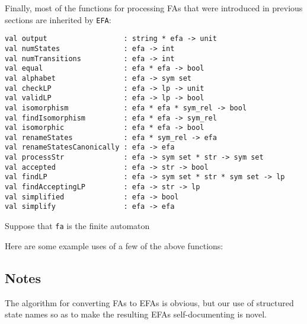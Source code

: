 Finally, most of the functions for processing FAs that were introduced
in previous sections are inherited by \texttt{EFA}:
\begin{verbatim}
val output                  : string * efa -> unit 
val numStates               : efa -> int
val numTransitions          : efa -> int
val equal                   : efa * efa -> bool
val alphabet                : efa -> sym set
val checkLP                 : efa -> lp -> unit
val validLP                 : efa -> lp -> bool
val isomorphism             : efa * efa * sym_rel -> bool
val findIsomorphism         : efa * efa -> sym_rel
val isomorphic              : efa * efa -> bool
val renameStates            : efa * sym_rel -> efa
val renameStatesCanonically : efa -> efa
val processStr              : efa -> sym set * str -> sym set
val accepted                : efa -> str -> bool
val findLP                  : efa -> sym set * str * sym set -> lp
val findAcceptingLP         : efa -> str -> lp
val simplified              : efa -> bool
val simplify                : efa -> efa
\end{verbatim}
%
%
%
%
%
%
%
%
%
%
%
%
%
%
%
%
%
%

Suppose that \texttt{fa} is the finite automaton
\begin{center}

\end{center}
Here are some example uses of a few of the above functions:


\subsection{Notes}

The algorithm for converting FAs to EFAs is obvious, but our use of
structured state names so as to make the resulting EFAs
self-documenting is novel.

%
%
%

